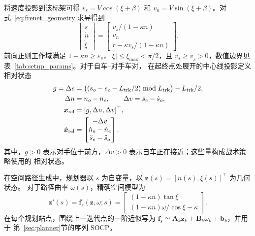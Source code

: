 \documentclass[final,5p,twocolumn]{elsarticle}
\begin{document}
将速度投影到该标架可得 $v_s=V\cos(\xi+\beta)$ 和
$v_n=V\sin(\xi+\beta)$。对式~\eqref{eq:frenet_geometry}求导得到
\begin{equation}
\begin{bmatrix}\dot s\\\dot n\\\dot\xi\end{bmatrix}
=
\begin{bmatrix}
v_s/(1-\kappa n)\\
v_n\\
r-\kappa v_s/(1-\kappa n)
\end{bmatrix}.
\label{eq:frenet_kinematics}
\end{equation}
前向正则工作域满足
$1-\kappa n\ge\varepsilon_s$，$|\xi|\le\xi_{\max}<\pi/2$，且
$v_s\ge\underline v_s>0$，数值边界见表~\ref{tab:setup_params}。对于自车--对手车对，
在起终点处展开的中心线投影定义相对状态
\begin{equation}
\begin{aligned}
g=\Delta s
&=\bigl((s_o-s_e+L_{\rm trk}/2)\bmod L_{\rm trk}\bigr)-L_{\rm trk}/2,\\
\Delta n&=n_o-n_e,\qquad
\Delta v=\dot s_e-\dot s_o,\\
\bm x_{\rm rel}&=[g,\Delta n,\Delta v]^\top,\\
\dot{\bm x}_{\rm rel}
&=
\begin{bmatrix}
-\Delta v\\
\dot n_o-\dot n_e\\
\ddot s_e-\ddot s_o
\end{bmatrix}.
\end{aligned}
\label{eq:rel}
\end{equation}
其中，$g>0$ 表示对手位于前方，$\Delta v>0$ 表示自车正在接近；这些量构成战术策略使用的
相对状态。

在空间路径生成中，规划器以 $s$ 为自变量，以 $\bm z(s)=[n(s),\xi(s)]^\top$ 为几何状态。
对于路径曲率 $\omega(s)$，精确空间模型为
\begin{equation}
\bm z'(s)=\bm f_s(\bm z,\omega;s)=
\begin{bmatrix}
(1-\kappa n)\tan\xi\\[2pt]
(1-\kappa n)\omega/\cos\xi-\kappa
\end{bmatrix}.
\label{eq:spatial_model}
\end{equation}
在每个规划站点，围绕上一迭代点的一阶近似写为
$\bm f_s\simeq\bm A_k\bm z_k+\bm B_k\omega_k+\bm b_k$，并用于
第~\ref{sec:planner}节的序列 SOCP。

\end{document}
